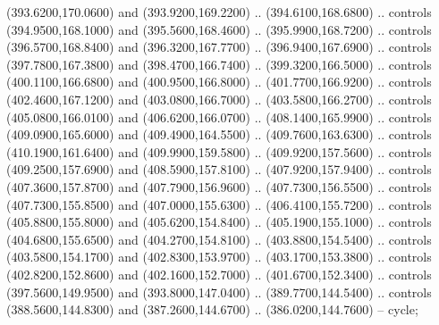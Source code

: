 {\begin{scope}[y=0.80pt, x=0.80pt, yscale=-1, xscale=1, inner sep=0pt, outer sep=0pt, #1]
      (393.6200,170.0600) and (393.9200,169.2200) .. (394.6100,168.6800) .. controls
      (394.9500,168.1000) and (395.5600,168.4600) .. (395.9900,168.7200) .. controls
      (396.5700,168.8400) and (396.3200,167.7700) .. (396.9400,167.6900) .. controls
      (397.7800,167.3800) and (398.4700,166.7400) .. (399.3200,166.5000) .. controls
      (400.1100,166.6800) and (400.9500,166.8000) .. (401.7700,166.9200) .. controls
      (402.4600,167.1200) and (403.0800,166.7000) .. (403.5800,166.2700) .. controls
      (405.0800,166.0100) and (406.6200,166.0700) .. (408.1400,165.9900) .. controls
      (409.0900,165.6000) and (409.4900,164.5500) .. (409.7600,163.6300) .. controls
      (410.1900,161.6400) and (409.9900,159.5800) .. (409.9200,157.5600) .. controls
      (409.2500,157.6900) and (408.5900,157.8100) .. (407.9200,157.9400) .. controls
      (407.3600,157.8700) and (407.7900,156.9600) .. (407.7300,156.5500) .. controls
      (407.7300,155.8500) and (407.0000,155.6300) .. (406.4100,155.7200) .. controls
      (405.8800,155.8000) and (405.6200,154.8400) .. (405.1900,155.1000) .. controls
      (404.6800,155.6500) and (404.2700,154.8100) .. (403.8800,154.5400) .. controls
      (403.5800,154.1700) and (402.8300,153.9700) .. (403.1700,153.3800) .. controls
      (402.8200,152.8600) and (402.1600,152.7000) .. (401.6700,152.3400) .. controls
      (397.5600,149.9500) and (393.8000,147.0400) .. (389.7700,144.5400) .. controls
      (388.5600,144.8300) and (387.2600,144.6700) .. (386.0200,144.7600) -- cycle;


\end{scope}}
